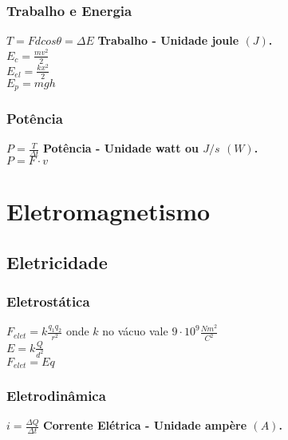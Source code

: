 \documentclass[
    12pt, %
    openright,
    twoside, %
    a4paper, %
    article,
    english,brazil %
]{abntex2}
\begin{document}
\subsection{Trabalho e Energia}

$T = Fdcos\theta = \Delta E$ \quad \textbf{Trabalho - Unidade joule $(J)$.} \\
$E_c = \frac{mv^2}{2}$ \\
$E_{el} = \frac{kx^2}{2}$ \\
$E_{p} = mgh$ \\

\subsection{Potência}

$P = \frac{T}{\Delta t}$ \quad \textbf{Potência - Unidade watt ou $J/s$ $(W)$.} \\
$P = F \cdot v$ \\

\chapter{Eletromagnetismo}

\section{Eletricidade}

\subsection{Eletrostática}

$F_{elet} = k\frac{q_1q_2}{r^2}$ onde $k$ no vácuo vale $9 \cdot 10^9 \frac{Nm^2}{C^2}$ \\
$E = k\frac{Q}{d^2}$ \\
$F_{elet} = Eq$ \\

\subsection{Eletrodinâmica}

$i = \frac{\Delta Q}{\Delta t}$ \quad \textbf{Corrente Elétrica - Unidade ampère $(A)$.}\\
\end{document}
